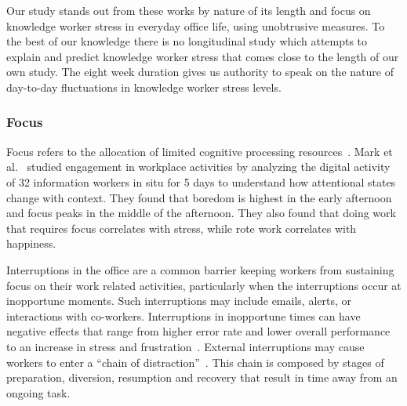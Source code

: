Our study stands out from these works by nature of its length and focus on knowledge worker stress in everyday office life, using unobtrusive measures. To the best of our knowledge there is no longitudinal study which attempts to explain and predict knowledge worker stress that comes close to the length of our own study. The eight week duration gives us authority to speak on the nature of day-to-day fluctuations in knowledge worker stress levels.




\subsubsection{Focus}
Focus refers to the allocation of limited cognitive processing resources~\cite{Anderson04}.
Mark et al.~\cite{mark2014bored} studied engagement in workplace activities by analyzing the digital activity of 32 information workers in situ for 5 days to understand how attentional states change with context. They found that boredom is highest in the early afternoon and focus peaks in the middle of the afternoon. They also found that doing work that requires focus correlates with stress, while rote work correlates with happiness.

Interruptions in the office are a common barrier keeping workers from sustaining focus on their work related activities, particularly when the interruptions occur at inopportune moments.
Such interruptions may include emails, alerts, or interactions with co-workers\cite{gonzalez2004constant,chong2006interruptions,shamsi07}. Interruptions in inopportune times can have negative effects that range from higher error rate and lower overall performance
to an increase in stress and frustration~\cite{bailey2001effects,czerwinski2000instant,mark2008cost}.
External interruptions may cause workers to enter a ``chain of distraction''~\cite{shamsi07}.
This chain is composed by stages of preparation, diversion, resumption and recovery that result in time away from an ongoing task. 

